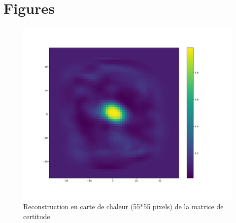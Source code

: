 
\chapter{Figures} %

\label{Figures} %



\begin{table}
\caption[Tableau]{Matériel utilisé pour réaliser les modélisations
}
\label{tab:materiel}
\end{table}

\begin{figure}[th]
\centering
\includegraphics[scale=0.4]{Figures/accuracy}
\decoRule %
\caption[Figure]{Reconstruction en carte de chaleur (55*55 pixels) de la matrice de certitude}
\label{fig:accuracy}
\end{figure}

